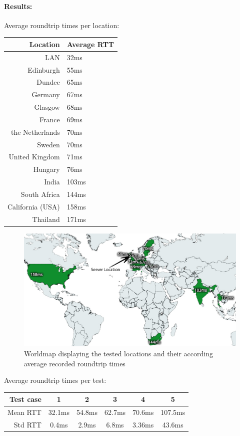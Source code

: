 \documentclass[bsc,frontabs,twoside,singlespacing,parskip,deptreport]{infthesis}     %
\begin{document}
\paragraph*{Results:}Average roundtrip times per location:
\begin{center}
  \begin{tabular}{ r | l }
Location		& Average RTT \\ \hline\hline
LAN				& 32ms	\\
Edinburgh		& 55ms	\\
Dundee			& 65ms	\\
Germany			& 67ms	\\
Glasgow			& 68ms	\\
France			& 69ms	\\
the Netherlands	& 70ms	\\
Sweden			& 70ms	\\
United Kingdom	& 71ms	\\
Hungary			& 76ms	\\
India			& 103ms	\\
South Africa	& 144ms	\\
California (USA)& 158ms	\\
Thailand		& 171ms	\\
  \end{tabular}
\end{center}

\begin{figure}
\centering
\includegraphics[scale=0.5]{images/worldmap.jpg}
\caption{Worldmap displaying the tested locations and their according average recorded roundtrip times}
\label{fig:worldmap}
\end{figure}

Average roundtrip times per test:
\begin{center}
  \begin{tabular}{ | r || c | c | c | c | c |}
    \hline
    Test case 		& 1 		& 2 		& 3 		& 4 		& 5 		\\ \hline\hline
    Mean RTT 		& 32.1ms 	& 54.8ms 	& 62.7ms 	& 70.6ms 	& 107.5ms	\\ \hline
    Std RTT			& 0.4ms		& 2.9ms		& 6.8ms		& 3.36ms	& 43.6ms	\\ \hline
  \end{tabular}
\end{center}
\end{document}
